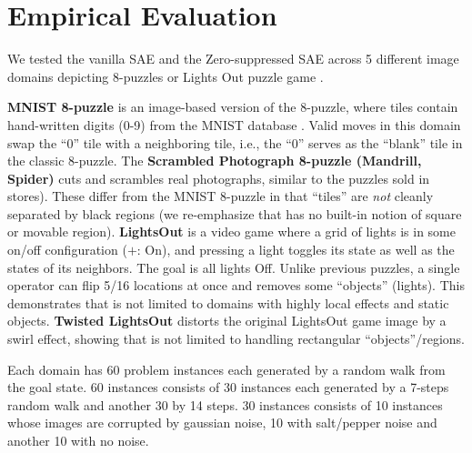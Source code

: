\section{Empirical Evaluation}
\label{evaluation}

We tested the vanilla SAE and the Zero-suppressed SAE across 5 different
image domains depicting 8-puzzles or Lights Out puzzle game \cite{lightsout}.

\textbf{MNIST 8-puzzle}
is an image-based version of the 8-puzzle, where tiles contain hand-written digits (0-9) from the  MNIST database \cite{lecun1998gradient}.
Valid moves in this domain swap the ``0'' tile  with a neighboring tile, i.e., the ``0'' serves as the ``blank'' tile in the classic 8-puzzle. 
The \textbf{Scrambled Photograph 8-puzzle (Mandrill, Spider)} cuts and scrambles real photographs, similar to the puzzles sold in stores).
These differ from the MNIST 8-puzzle in that ``tiles'' are \textit{not} cleanly separated by black regions
(we re-emphasize that \latentplanner has no built-in notion of square or movable region).
\textbf{LightsOut} is
a video game where a grid of lights is in some on/off configuration ($+$: On),
and pressing a light toggles its state as well as the states of its neighbors.
The goal is all lights Off.
Unlike previous puzzles, a single operator can flip 5/16 locations at once and
removes some ``objects'' (lights).
This demonstrates that \latentplanner is not limited to domains with highly local effects and static objects.
\textbf{Twisted LightsOut} distorts the original LightsOut game image by a swirl effect, 
showing that \latentplanner is not limited to handling rectangular ``objects''/regions.

Each domain has 60 problem instances each generated by a random walk from
the goal state. 60 instances consists of 30 instances each generated by a 7-steps random walk
and another 30 by 14 steps. 30 instances consists of 10 instances whose images are corrupted by gaussian noise,
10 with salt/pepper noise and another 10 with no noise.

